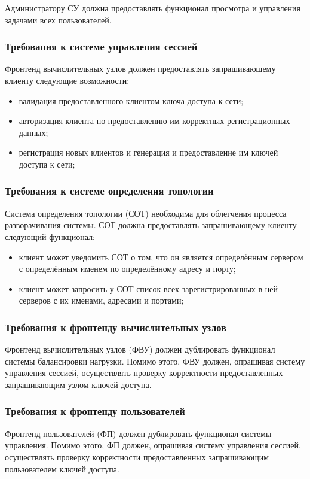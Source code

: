 \documentclass[a4paper,12pt]{report}
\numberwithin{equation}{section}
\begin{document}
Администратору СУ должна предоставлять функционал просмотра и управления задачами всех пользователей.

\subsubsection{Требования к системе управления сессией}
Фронтенд вычислительных узлов должен предоставлять запрашивающему клиенту следующие возможности:
\begin{itemize}
    \item валидация предоставленного клиентом ключа доступа к сети;
    \item авторизация клиента по предоставлению им корректных регистрационных данных;
    \item регистрация новых клиентов и генерация и предоставление им ключей доступа к сети;
\end{itemize}

\subsubsection{Требования к системе определения топологии}
Система определения топологии (СОТ) необходима для облегчения процесса разворачивания системы.
СОТ должна предоставлять запрашивающему клиенту следующий функционал:
\begin{itemize}
  \item клиент может уведомить СОТ о том, что он является определённым сервером с определённым именем по определённому адресу и порту;
  \item клиент может запросить у СОТ список всех зарегистрированных в ней серверов с их именами, адресами и портами;
\end{itemize}

\subsubsection{Требования к фронтенду вычислительных узлов}
Фронтенд вычислительных узлов (ФВУ) должен дублировать функционал системы балансировки нагрузки. Помимо этого, ФВУ должен, опрашивая систему управления сессией, осуществлять проверку корректности предоставленных запрашивающим узлом ключей доступа.

\subsubsection{Требования к фронтенду пользователей}
Фронтенд пользователей (ФП) должен дублировать функционал системы управления. Помимо этого, ФП должен, опрашивая систему управления сессией, осуществлять проверку корректности предоставленных запрашивающим пользователем ключей доступа.
\end{document}
